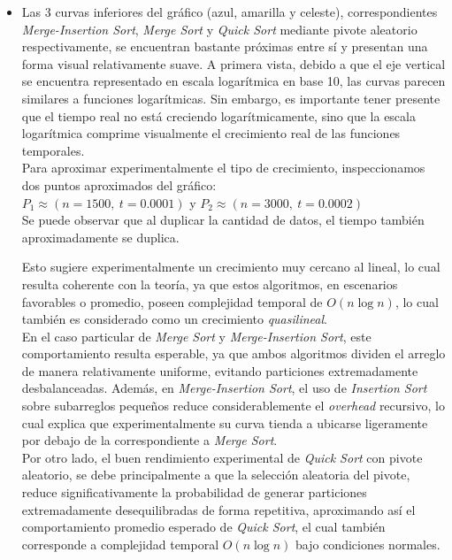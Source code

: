\begin{itemize}
    \item Las 3 curvas inferiores del gráfico (azul, amarilla y celeste), correspondientes \textit{Merge-Insertion Sort}, \textit{Merge Sort} y \textit{Quick Sort} 
          mediante pivote aleatorio respectivamente, se encuentran bastante próximas entre sí y presentan una forma visual relativamente suave.  
          A primera vista, debido a que el eje vertical se encuentra representado en escala logarítmica en base 10, las curvas parecen similares a funciones logarítmicas.  
          Sin embargo, es importante tener presente que el tiempo real no está creciendo logarítmicamente, sino que la escala logarítmica comprime visualmente el 
          crecimiento real de las funciones temporales. \\

          Para aproximar experimentalmente el tipo de crecimiento, inspeccionamos dos puntos aproximados del gráfico: \\
          
          $P_1 \approx (n=1500,\ t=0.0001)$ y $P_2 \approx (n=3000,\ t=0.0002)$ \\

          Se puede observar que al duplicar la cantidad de datos, el tiempo también aproximadamente se duplica.

          Esto sugiere experimentalmente un crecimiento muy cercano al lineal, lo cual resulta coherente con la teoría, ya que estos algoritmos, en escenarios 
          favorables o promedio, poseen complejidad temporal de $O(n \log n)$, lo cual también es considerado como un crecimiento \textit{quasilineal}. \\

          En el caso particular de \textit{Merge Sort} y \textit{Merge-Insertion Sort}, este comportamiento resulta esperable, ya que ambos algoritmos dividen 
          el arreglo de manera relativamente uniforme, evitando particiones extremadamente desbalanceadas.  Además, en \textit{Merge-Insertion Sort}, el uso de 
          \textit{Insertion Sort} sobre subarreglos pequeños reduce considerablemente el \textit{overhead} recursivo, lo cual explica que experimentalmente su 
          curva tienda a ubicarse ligeramente por debajo de la correspondiente a \textit{Merge Sort}. \\

          Por otro lado, el buen rendimiento experimental de \textit{Quick Sort} con pivote aleatorio, se debe principalmente a que la selección aleatoria del 
          pivote, reduce significativamente la probabilidad de generar particiones extremadamente desequilibradas de forma repetitiva, aproximando así el 
          comportamiento promedio esperado de \textit{Quick Sort}, el cual también corresponde a complejidad temporal $O(n \log n)$ bajo condiciones normales.


\end{itemize}
